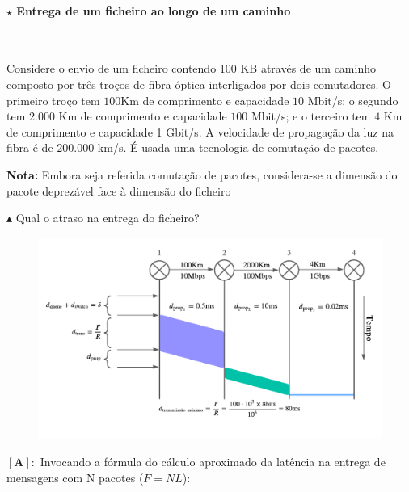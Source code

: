 \clearpage
\paragraph[1.3.2.2 Entrega de um ficheiro ao longo de um caminho]{$\pmb{\star}$ Entrega de um ficheiro ao longo de um caminho}\mbox{}\\[4pt]
{\small
    Considere o envio de um ficheiro contendo 100 KB através de um caminho composto por três troços de fibra óptica interligados por dois comutadores. O primeiro troço tem $100$Km de comprimento e capacidade $10$ Mbit/s; o segundo tem $2.000$ Km de comprimento e capacidade $100$ Mbit/s; e o terceiro tem $4$ Km de comprimento e capacidade 1 Gbit/s. A velocidade de propagação da luz na fibra é de $200.000$ km/s. É usada uma tecnologia de comutação de pacotes.
    
    \vspace{1 em}
    \noindent \textbf{Nota:} Embora seja referida comutação de pacotes, considera-se a dimensão do pacote deprezável face à dimensão do ficheiro
}

\vspace{1 em}
\noindent $\blacktriangle$ Qual o atraso na entrega do ficheiro?

\vspace{-0.75em}
\begin{figure}[H]
    \centering
    \includegraphics[width = 0.85\linewidth]{img/1/network-delay-diagram.png}
    \label{fig:NetworkDelayDiagram}
\end{figure}

\vspace{-1em}
\noindent $\pmb{[\textbf{A}]:}$ Invocando a fórmula do cálculo aproximado da latência na entrega de mensagens com N pacotes ($F = NL$):


